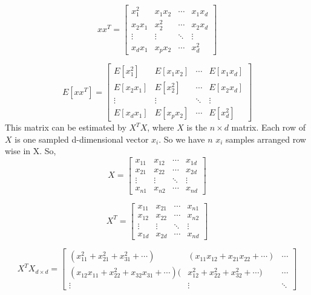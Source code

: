 \documentclass[17pt]{article}
\begin{document}
$$xx^T = {
      {	\begin{bmatrix}
          x_{1}^2 &x_{1}x_{2} &\cdots &x_{1}x_{d}\\
          x_{2}x_{1} &x_{2}^2 &\cdots &x_{2}x_{d}\\
          \vdots &\vdots &\ddots &\vdots\\
          x_{d}x_{1} &x_{p}x_{2} &\cdots &x_{d}^2
      	\end{bmatrix}
      }
	}
$$

$$E[xx^T] = {
      {  \begin{bmatrix}
           E[x_{1}^2] &E[x_{1}x_{2}] &\cdots &E[x_{1}x_{d}]\\
           E[x_{2}x_{1}] &E[x_{2}^2] &\cdots &E[x_{2}x_{d}]\\
           \vdots &\vdots &\ddots &\vdots\\
           E[x_{d}x_{1}] &E[x_{p}x_{2}] &\cdots &E[x_{d}^2]
           \end{bmatrix}}
}$$
This matrix can be estimated by $X^{T}X$, where $X$ is the $n \times d$ matrix. Each row of $X$ is one sampled d-dimensional vector $x_i$. So we have $n$ $x_i$ samples arranged row wise in X. So,
$$X = {
	       {\begin{bmatrix}
                x_{11} &x_{12} &\cdots &x_{1d}\\
                x_{21} &x_{22} &\cdots &x_{2d}\\
                \vdots &\vdots &\ddots &\vdots\\
                x_{n1} &x_{n2} &\cdots &x_{nd}
                \end{bmatrix}}
}$$

$$X^{T} = {
                {\begin{bmatrix}

                                x_{11} &x_{21} &\cdots &x_{n1}\\

                                x_{12} &x_{22} &\cdots &x_{n2}\\

                                \vdots &\vdots &\ddots &\vdots\\

                                x_{1d} &x_{2d} &\cdots &x_{nd}

                                \end{bmatrix}}
}$$

$$X^{T}X_{d \times d} = {
                {\begin{bmatrix}
                                (x_{11}^{2}+x_{21}^{2}+x_{31}^{2}+\cdots) &(x_{11}x_{12}+  x_{21}x_{22}+ \cdots) &\cdots\\
                                (x_{12}x_{11}+x_{22}^{2}+x_{32}x_{31}+\cdots) (&x_{12}^{2}+x_{22}^{2}+x_{32}^{2}+\cdots) &\cdots \\
                                \vdots &\vdots &\ddots
                                \end{bmatrix}}
}$$
\end{document}
